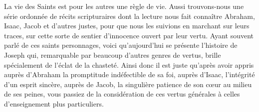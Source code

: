  La vie des Saints est pour les autres une règle de vie. Aussi trouvons-nous une série ordonnée de récits scripturaires dont la lecture nous fait connaître Abraham, Isaac, Jacob et d’autres justes, pour que nous les suivions en marchant sur leurs traces, sur cette sorte de sentier d’innocence ouvert par leur vertu. Ayant souvent parlé de ces saints personnages, voici qu’aujourd’hui se présente l’histoire de Joseph qui, remarquable par beaucoup d’autres genres de vertus, brille spécialement de l’éclat de la chasteté. Ainsi donc il est juste qu’après avoir appris auprès d’Abraham la promptitude indéfectible de sa foi, auprès d’Isaac, l’intégrité d’un esprit sincère, auprès de Jacob, la singulière patience de son cœur au milieu de ses peines, vous passiez de la considération de ces vertus générales à celles d’enseignement plus particuliers.